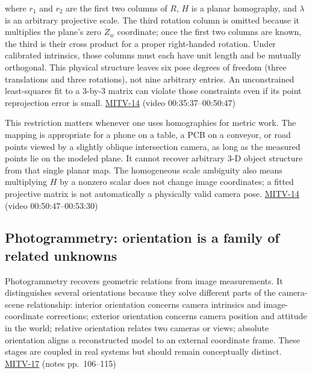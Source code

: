 where \(r_1\) and \(r_2\) are the first two columns of \(R\), \(H\) is a planar homography, and \(\lambda\) is an arbitrary projective scale. The third rotation column is omitted because it multiplies the plane's zero \(Z_w\) coordinate; once the first two columns are known, the third is their cross product for a proper right-handed rotation. Under calibrated intrinsics, those columns must each have unit length and be mutually orthogonal. This physical structure leaves six pose degrees of freedom (three translations and three rotations), not nine arbitrary entries. An unconstrained least-squares fit to a 3-by-3 matrix can violate those constraints even if its point reprojection error is small. \hyperref[04-visual-computing-ii-ch036-mitv-14---inspection-in-patquick-hough-transform-homography-position-determination-multi-scale]{MITV-14} (video 00:35:37--00:50:47)

This restriction matters whenever one uses homographies for metric work. The mapping is appropriate for a phone on a table, a PCB on a conveyor, or road points viewed by a slightly oblique intersection camera, as long as the measured points lie on the modeled plane. It cannot recover arbitrary 3-D object structure from that single planar map. The homogeneous scale ambiguity also means multiplying \(H\) by a nonzero scalar does not change image coordinates; a fitted projective matrix is not automatically a physically valid camera pose. \hyperref[04-visual-computing-ii-ch036-mitv-14---inspection-in-patquick-hough-transform-homography-position-determination-multi-scale]{MITV-14} (video 00:50:47--00:53:30)

\subsection{Photogrammetry: orientation is a family of related unknowns}\label{04-visual-computing-ii-ch032-photogrammetry-orientation-is-a-family-of-related-unknowns}

Photogrammetry recovers geometric relations from image measurements. It distinguishes several orientations because they solve different parts of the camera-scene relationship: interior orientation concerns camera intrinsics and image-coordinate corrections; exterior orientation concerns camera position and attitude in the world; relative orientation relates two cameras or views; absolute orientation aligns a reconstructed model to an external coordinate frame. These stages are coupled in real systems but should remain conceptually distinct. \hyperref[04-visual-computing-ii-ch036-mitv-17---photogrammetry-orientation-axes-of-inertia-symmetry-orientation]{MITV-17} (notes pp.~106--115)

